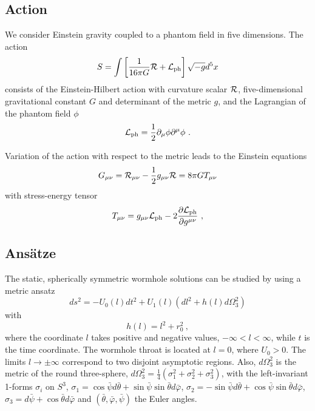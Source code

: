 \documentclass[showpacs,preprintnumbers,amsmath,amssymb,floatfix]{revtex4}
\begin{document}
\subsection{Action}
We consider Einstein gravity coupled to a phantom field in five dimensions. 
The action 
%
\begin{equation}
S=\int \left[ \frac{1}{16\pi G}{\cal R} + 
{\cal L}_{\rm ph}  \right]\sqrt{-g}d^5x  
 \label{action}
\end{equation}
%
consists of the Einstein-Hilbert action
with curvature scalar $\cal R$, five-dimensional gravitational constant $G$ and determinant of the 
metric $g$, and the Lagrangian of the phantom field $\phi$  
\begin{equation}
 {\cal L}_{\rm ph} = \frac{1}{2}\partial_\mu \phi\partial^\mu \phi \ .
\label{lphi}
\end{equation}

Variation of the action with respect to the metric
leads to the Einstein equations
%
\begin{equation}
G_{\mu\nu}= {\cal R}_{\mu\nu}-\frac{1}{2}g_{\mu\nu}{\cal R} = 8\pi G T_{\mu\nu}
\label{ee} 
\end{equation}
%
with stress-energy tensor
%
\begin{equation}
T_{\mu\nu} = g_{\mu\nu}{{\cal L}}_{\rm ph}
-2 \frac{\partial {{\cal L}}_{\rm ph}}{\partial g^{\mu\nu}} \ ,
\label{tmunu} 
\end{equation}
%
\subsection{Ans\"atze}
The static, spherically symmetric wormhole solutions  
can be studied by using  a metric ansatz
\begin{equation}
\label{metric-static}
ds^2=-U_0(l) dt^2 +U_1(l)\left(dl^2+h(l)d\Omega_3^2 \right) 
\end{equation}
with
\begin{equation}
h(l)=l^2+r_0^2~,
\end{equation}
where
the coordinate $l$ takes positive and negative 
values, $-\infty< l < \infty$, while $t$ is the time coordinate. 
The wormhole throat is located at $l=0$,
where $U_0>0$.
 The limits $l\to \pm\infty$
correspond to two disjoint asymptotic regions.
Also, $d\Omega_3^2$ is the metric of the round three-sphere, 
$d\Omega_3^2=\frac{1}{4}(\sigma_1^2+\sigma_2^2+\sigma_3^2)$,
with the left-invariant 
1-forms $\sigma_i$ on $S^3$, 
$\sigma_1=\cos \bar\psi d\bar \theta+\sin\bar\psi \sin \bar \theta d \bar\varphi$,
$\sigma_2=-\sin \bar \psi d\bar \theta+\cos\bar\psi \sin \bar \theta d\bar \varphi$,
$\sigma_3=d\bar\psi  + \cos \bar \theta d \bar\varphi$  
 and $(\bar \theta,\bar \varphi, \bar \psi)$ the Euler angles.
\end{document}
